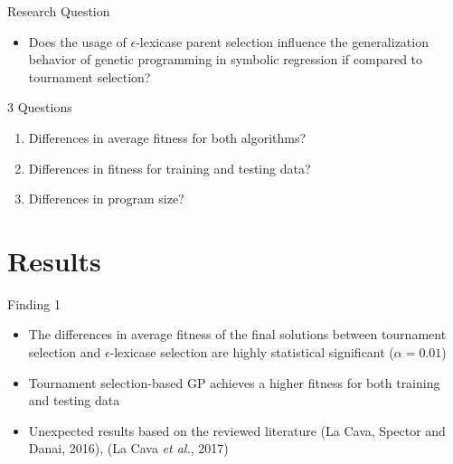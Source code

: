\documentclass[
  ignorenonframetext,
]{beamer}
\providecommand{\tightlist}{%
  \setlength{\itemsep}{0pt}\setlength{\parskip}{0pt}}
\begin{document}
\begin{frame}{Research Question}
\protect\hypertarget{research-question-1}{}
\begin{itemize}
\tightlist
\item
  Does the usage of \(\epsilon\)-lexicase parent selection influence the
  generalization behavior of genetic programming in symbolic regression
  if compared to tournament selection?
\end{itemize}

\begin{block}{3 Questions}
\protect\hypertarget{questions}{}
\begin{enumerate}
\tightlist
\item
  Differences in average fitness for both algorithms?
\item
  Differences in fitness for training and testing data?
\item
  Differences in program size?
\end{enumerate}
\end{block}
\end{frame}

\hypertarget{results}{%
\section{Results}\label{results}}

\begin{frame}{Finding 1}
\protect\hypertarget{finding-1}{}
\begin{itemize}
\tightlist
\item
  The differences in average fitness of the final solutions between
  tournament selection and \(\epsilon\)-lexicase selection are highly
  statistical significant (\(\alpha=0.01\))
\item
  Tournament selection-based GP achieves a higher fitness for both
  training and testing data
\item
  Unexpected results based on the reviewed literature (La Cava, Spector
  and Danai, 2016), (La Cava \emph{et al.}, 2017)
\end{itemize}
\end{frame}
\end{document}
